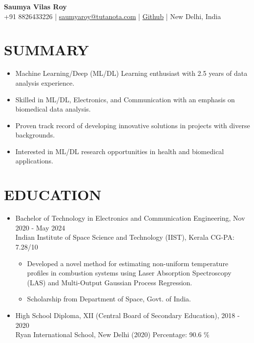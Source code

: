 \documentclass[11pt]{article}
\begin{document}
	
	\begin{center}
		{\huge\bf Saumya Vilas Roy} \\
		
		\vspace{3mm} %
		{\large
			+91 8826433226 |
			\href{mailto:saumyaroy@tutanota.com}{saumyaroy@tutanota.com} |
				\href{https://4d2.link/saumya}{Github} |
			New Delhi, India
		} \\
		{
	
		}
	\end{center}
	
	\section*{\bf SUMMARY}
	\begin{itemize}[leftmargin=*,noitemsep,topsep=0pt]
		\item Machine Learning/Deep (ML/DL) Learning enthusiast with 2.5 years of data analysis experience.
		\item Skilled in ML/DL, Electronics, and Communication with an emphasis on biomedical data analysis.
		\item Proven track record of developing innovative solutions in projects with diverse backgrounds.
		\item Interested in ML/DL research opportunities in health and biomedical applications.
	\end{itemize}
	
	\section*{\bf EDUCATION}
	\begin{itemize}[leftmargin=*,noitemsep,topsep=0pt]
		\item Bachelor of Technology in Electronics and Communication Engineering, \hfill Nov 2020 - May 2024 \\
		Indian Institute of Space Science and Technology (IIST), Kerala \hfill CG-PA: 7.28/10
		\begin{itemize}[leftmargin=*,noitemsep,topsep=0pt]
			\item Developed a novel method for estimating non-uniform temperature profiles in combustion systems using Laser Absorption Spectroscopy (LAS) and Multi-Output Gaussian Process Regression.
			\item Scholarship from Department of Space, Govt. of India.
		\end{itemize}
		\item High School Diploma, XII (Central Board of Secondary Education), \hfill 2018 - 2020\\
		Ryan International School, New Delhi (2020)  \hfill Percentage: 90.6 \%
	\end{itemize}
	
\end{document}
